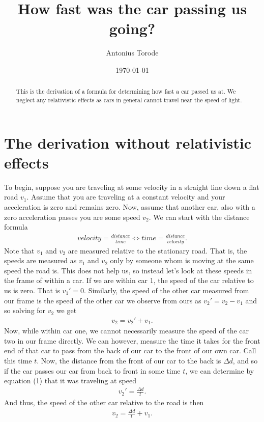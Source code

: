 \documentclass[]{article}
\title{How fast was the car passing us going?}
\author{Antonius Torode}
\date{\today}
\begin{document}
\maketitle

\begin{abstract}
This is the derivation of a formula for determining how fast a car passed us at. We neglect any relativistic effects as cars in general cannot travel near the speed of light.
\end{abstract}

\section{The derivation without relativistic effects}
To begin, suppose you are traveling at some velocity in a straight line down a flat road $v_1$. Assume that you are traveling at a constant velocity and your acceleration is zero and remains zero. Now, assume that another car, also with a zero acceleration passes you are some speed $v_2$. We can start with the distance formula
\begin{align}
	velocity = \frac{distance}{time} \Longleftrightarrow time = \frac{distance}{velocity}. 
\end{align}
Note that $v_1$ and $v_2$ are measured relative to the stationary road. That is, the speeds are measured as $v_1$ and $v_2$ only by someone whom is moving at the same speed the road is. This does not help us, so instead let's look at these speeds in the frame of within a car. If we are within car 1, the speed of the car relative to us is zero. That is $v_1'=0$. Similarly, the speed of the other car measured from our frame is the speed of the other car we observe from ours as $v_2'=v_2-v_1$ and so solving for $v_2$ we get 
\begin{align}
v_2=v_2'+v_1.
\end{align} Now, while within car one, we cannot necessarily measure the speed of the car two in our frame directly. We can however, measure the time it takes for the front end of that car to pass from the back of our car to the front of our own car. Call this time $t$. Now, the distance from the front of our car to the back is $\Delta d$, and so if the car passes our car from back to front in some time $t$, we can determine by equation (1) that it was traveling at speed
\begin{align}
v_2'=\frac{\Delta d}{t}.
\end{align}
And thus, the speed of the other car relative to the road is then
\begin{align}
v_2=\frac{\Delta d}{t}+v_1.
\end{align}
\end{document}
